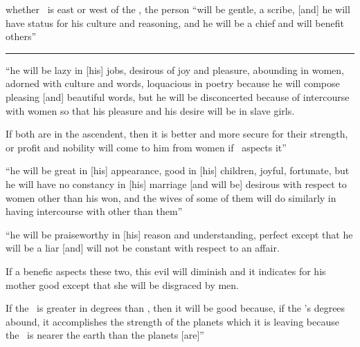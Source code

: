\begin{description}[style=multiline,leftmargin=1.5cm]
\item[\Sun,\Mercury]
whether \Mercury\, is east or west of the \Sun, the person ``will be gentle, a scribe, [and] he will have status for his culture and reasoning, and he will be a chief and will benefit others''

\vspace{0.5em}\hrule
\item[\Venus,\Mercury]
``he will be lazy in [his] jobs, desirous of joy and pleasure, abounding in women, adorned with culture and words, loquacious in poetry because he will compose pleasing [and] beautiful words, but he will be disconcerted because of intercourse with women so that his pleasure and his desire will be in slave girls.

If both are in the ascendent, then it is better and more secure for their strength, or profit and nobility will come to him from women if \Jupiter\, aspects it''

\item[\Venus,\Moon]
``he will be great in [his] appearance, good in [his] children, joyful, fortunate, but he will have no constancy in [his] marriage [and will be] desirous with respect to women other than his won, and the wives of some of them will do similarly in having intercourse with other than them''

\item[\Mercury,\Moon]
``he will be praiseworthy in [his] reason and understanding, perfect except that he will be a liar [and] will not be constant with respect to an affair.

If a benefic aspects these two, this evil will diminish and it indicates for his mother good except that she will be disgraced by men.

If the \Moon\, is greater in degrees than \Mercury, then it will be good because, if the \Moon's degrees abound, it accomplishes the strength of the planets which it is leaving because the \Moon\, is nearer the earth than the planets [are]''

\end{description}